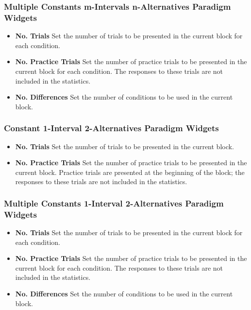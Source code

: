 \documentclass[a4paper,12pt,english]{sphinxmanual}
\begin{document}
\subsubsection{Multiple Constants m-Intervals n-Alternatives Paradigm Widgets}
\label{graphical_user_interface:multiple-constants-m-intervals-n-alternatives-paradigm-widgets}\begin{itemize}
\item {} 
\textbf{No. Trials} Set the number of trials to be presented in the
current block for each condition.

\item {} 
\textbf{No. Practice Trials} Set the number of practice trials to be
presented in the current block for each condition. The responses to
these trials are not included in the statistics.

\item {} 
\textbf{No. Differences} Set the number of conditions to be used in the
current block.

\end{itemize}


\subsubsection{Constant 1-Interval 2-Alternatives Paradigm Widgets}
\label{graphical_user_interface:constant-1-interval-2-alternatives-paradigm-widgets}\begin{itemize}
\item {} 
\textbf{No. Trials} Set the number of trials to be presented in the
current block.

\item {} 
\textbf{No. Practice Trials} Set the number of practice trials to be
presented in the current block. Practice trials are presented at the
beginning of the block; the responses to these trials are not
included in the statistics.

\end{itemize}


\subsubsection{Multiple Constants 1-Interval 2-Alternatives Paradigm Widgets}
\label{graphical_user_interface:multiple-constants-1-interval-2-alternatives-paradigm-widgets}\begin{itemize}
\item {} 
\textbf{No. Trials} Set the number of trials to be presented in the
current block for each condition.

\item {} 
\textbf{No. Practice Trials} Set the number of practice trials to be
presented in the current block for each condition. The responses to
these trials are not included in the statistics.

\item {} 
\textbf{No. Differences} Set the number of conditions to be used in the
current block.

\end{itemize}
\end{document}

